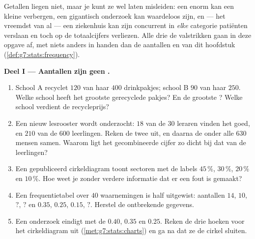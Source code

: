 \begin{problem}
\label{pb:g7:stats:1}
Getallen liegen niet, maar je kunt ze wel laten misleiden: een enorm  kan een
kleine  verbergen, een gigantisch onderzoek kan waardeloos zijn, en ---
het vreemdst van al --- een ziekenhuis kan zijn concurrent in \emph{elke} categorie
patiënten verslaan en toch op de totaalcijfers verliezen. Alle drie de valstrikken
gaan in deze opgave af, met niets anders in handen dan de aantallen en 
van dit hoofdstuk (\cref{def:g7:stats:frequency}).

\medskip
\noindent\textbf{Deel I --- Aantallen zijn geen .}
\begin{enumerate}
  \item School A recyclet $120$ van haar $400$ drinkpakjes; school B $90$ van haar
        $250$. Welke school heeft het grootste \emph{} gerecyclede pakjes? En
        de grootste \emph{}? Welke school verdient de recycleprijs?
  \item Een nieuw lesrooster wordt onderzocht: $18$ van de $30$ leraren vinden het
        goed, en $210$ van de $600$ leerlingen. Reken de twee  uit, en
        daarna de  onder alle $630$ mensen samen. Waarom ligt het
        gecombineerde cijfer zo dicht bij dat van de leerlingen?
  \item Een gepubliceerd cirkeldiagram toont sectoren met de labels $45\,\%$,
        $30\,\%$, $20\,\%$ en $10\,\%$. Hoe weet je zonder verdere informatie dat
        er een fout is gemaakt?
  \item Een frequentietabel over $40$ waarnemingen is half uitgewist: aantallen
        $14$, $10$, $?$, $?$ en  $0.35$, $0.25$, $0.15$, $?$. Herstel de
        ontbrekende gegevens.
  \item Een onderzoek eindigt met de  $0.40$, $0.35$ en $0.25$. Reken de
        drie hoeken voor het cirkeldiagram uit
        (\cref{met:g7:stats:charts}) en ga na dat ze de cirkel sluiten.
\end{enumerate}


\end{problem}
